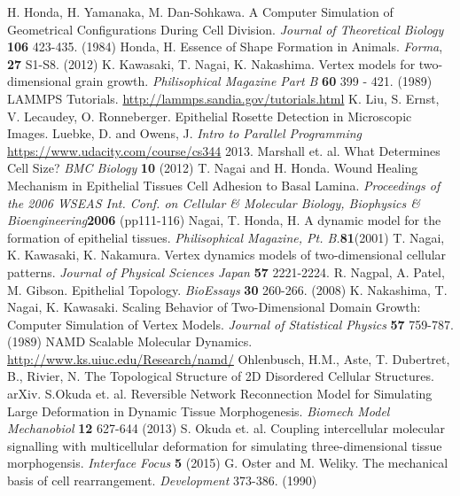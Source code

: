 \begin{thebibliography}{1}
 H. Honda, H. Yamanaka, M. Dan-Sohkawa. A Computer Simulation of Geometrical Configurations During Cell Division. \emph{Journal of Theoretical Biology} \textbf{106} 423-435. (1984)
 Honda, H. Essence of Shape Formation in Animals. \emph{Forma}, \textbf{27} S1-S8. (2012)
 K. Kawasaki, T. Nagai, K. Nakashima. Vertex models for two-dimensional grain growth. \emph{Philisophical Magazine Part B} \textbf{60} 399 - 421. (1989)
 LAMMPS Tutorials. \url{http://lammps.sandia.gov/tutorials.html}
 K. Liu, S. Ernst, V. Lecaudey, O. Ronneberger. Epithelial Rosette Detection in Microscopic Images.
 Luebke, D. and Owens, J. \emph{Intro to Parallel Programming} \url{https://www.udacity.com/course/cs344} 2013.
 Marshall et. al. What Determines Cell Size? \emph{BMC Biology} \textbf{10} (2012)
 T. Nagai and H. Honda. Wound Healing Mechanism in Epithelial Tissues Cell Adhesion to Basal Lamina. \emph{Proceedings of the 2006 WSEAS Int. Conf. on Cellular \& Molecular Biology, Biophysics \& Bioengineering}\textbf{2006} (pp111-116)
 Nagai, T. Honda, H. A dynamic model for the formation of epithelial tissues. \emph{Philisophical Magazine, Pt. B.}\textbf{81}(2001) 
 T. Nagai, K. Kawasaki, K. Nakamura. Vertex dynamics models of two-dimensional cellular patterns. \emph{Journal of Physical Sciences Japan} \textbf{57} 2221-2224.
 R. Nagpal, A. Patel, M. Gibson. Epithelial Topology. \emph{BioEssays} \textbf{30} 260-266. (2008)
 K. Nakashima, T. Nagai, K. Kawasaki. Scaling Behavior of Two-Dimensional  Domain Growth: Computer Simulation of Vertex Models. \emph{Journal of Statistical Physics} \textbf{57} 759-787. (1989)
 NAMD Scalable Molecular Dynamics. \url{http://www.ks.uiuc.edu/Research/namd/}
 Ohlenbusch, H.M., Aste, T. Dubertret, B., Rivier, N. The Topological Structure of 2D Disordered Cellular Structures. arXiv.
 S.Okuda et. al. Reversible Network Reconnection Model for Simulating Large Deformation in Dynamic Tissue Morphogenesis. \emph{Biomech Model Mechanobiol} \textbf{12} 627-644 (2013)
 S. Okuda et. al. Coupling intercellular molecular signalling with multicellular deformation for simulating three-dimensional tissue morphogensis. \emph{Interface Focus} \textbf{5} (2015)
G. Oster and M. Weliky. The mechanical basis of cell rearrangement. \emph{Development}  373-386. (1990)

\end{thebibliography}
